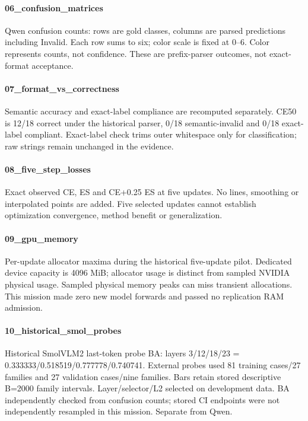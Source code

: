 \paragraph{06\_confusion\_matrices} Qwen confusion counts: rows are gold classes, columns are parsed predictions including Invalid. Each row sums to six; color scale is fixed at 0–6. Color represents counts, not confidence. These are prefix-parser outcomes, not exact-format acceptance.

\paragraph{07\_format\_vs\_correctness} Semantic accuracy and exact-label compliance are recomputed separately. CE50 is 12/18 correct under the historical parser, 0/18 semantic-invalid and 0/18 exact-label compliant. Exact-label check trims outer whitespace only for classification; raw strings remain unchanged in the evidence.

\paragraph{08\_five\_step\_losses} Exact observed CE, ES and CE+0.25 ES at five updates. No lines, smoothing or interpolated points are added. Five selected updates cannot establish optimization convergence, method benefit or generalization.

\paragraph{09\_gpu\_memory} Per-update allocator maxima during the historical five-update pilot. Dedicated device capacity is 4096 MiB; allocator usage is distinct from sampled NVIDIA physical usage. Sampled physical memory peaks can miss transient allocations. This mission made zero new model forwards and passed no replication RAM admission.

\paragraph{10\_historical\_smol\_probes} Historical SmolVLM2 last-token probe BA: layers 3/12/18/23 = 0.333333/0.518519/0.777778/0.740741. External probes used 81 training cases/27 families and 27 validation cases/nine families. Bars retain stored descriptive B=2000 family intervals. Layer/selector/L2 selected on development data. BA independently checked from confusion counts; stored CI endpoints were not independently resampled in this mission. Separate from Qwen.

